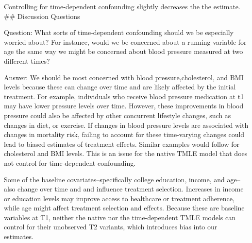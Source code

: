 \documentclass[
]{article}
\begin{document}
Controlling for time-dependent confounding slightly decreases the the
estimate. \#\# Discussion Questions

Question: What sorts of time-dependent confounding should we be
especially worried about? For instance, would we be concerned about a
running variable for age the same way we might be concerned about blood
pressure measured at two different times?

Answer: We should be most concerned with blood pressure,cholesterol, and
BMI levels because these can change over time and are likely affected by
the initial treatment. For example, individuals who receive blood
pressure medication at t1 may have lower pressure levels over time.
However, these improvements in blood pressure could also be affected by
other concurrent lifestyle changes, such as changes in diet, or
exercise. If changes in blood pressure levels are associated with
changes in mortality risk, failing to account for these time-varying
changes could lead to biased estimates of treatment effects. Similar
examples would follow for cholesterol and BMI levels. This is an issue
for the native TMLE model that does not control for time-dependent
confounding.

Some of the baseline covariates--specifically college education, income,
and age--also change over time and and influence treatment selection.
Increases in income or education levels may improve access to healthcare
or treatment adherence, while age might affect treatment selection and
effects. Because these are baseline variables at T1, neither the native
nor the time-dependent TMLE models can control for their unobserved T2
variants, which introduces bias into our estimates.
\end{document}

